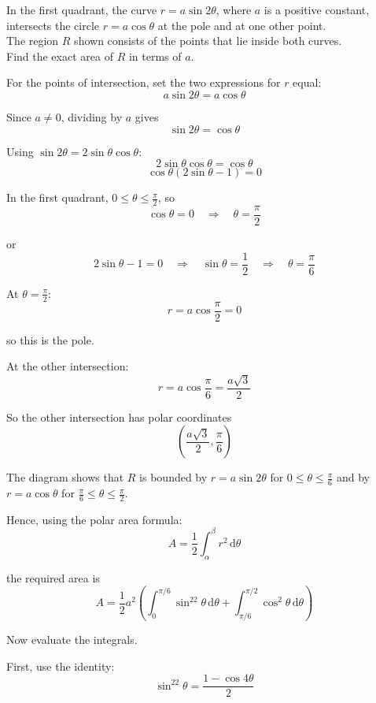 \documentclass[leqno]{article}
\begin{document}
\begin{enumerate}[
	  label=\textbf{\arabic*.},
	  leftmargin=*,
	  topsep=0pt,
	  partopsep=0pt,
	  parsep=0pt
	]
In the first quadrant, the curve $r=a\sin 2\theta$, where $a$ is a positive constant, intersects the circle $r=a\cos\theta$ at the pole and at one other point. \\

The region $R$ shown consists of the points that lie inside both curves. \\

Find the exact area of $R$ in terms of $a$.  \\

	\vspace*{10pt}
	
	\begin{djsSolution}
	For the points of intersection, set the two expressions for \(r\) equal:
	\[
	a\sin 2\theta=a\cos\theta
	\]
	
	Since \(a\neq 0\), dividing by \(a\) gives
	\[
	\sin 2\theta=\cos\theta
	\]
	
	Using \(\sin 2\theta=2\sin\theta\cos\theta\):
	\[
	2\sin\theta\cos\theta=\cos\theta
	\]
	\[
	\cos\theta(2\sin\theta-1)=0
	\]
	
	In the first quadrant, \(0\le \theta\le \frac{\pi}{2}\), so
	\[
	\cos\theta=0\quad\Longrightarrow\quad\theta=\frac{\pi}{2}
	\]

	or
	\[
	2\sin\theta-1=0\quad\Longrightarrow\quad\sin\theta=\frac12\quad\Longrightarrow\quad\theta=\frac{\pi}{6}
	\]
	
	At \(\theta=\frac{\pi}{2}\):
	\[
	r=a\cos\frac{\pi}{2}=0
	\]

	so this is the pole.
	
	At the other intersection:
	\[
	r=a\cos\frac{\pi}{6}=\frac{a\sqrt3}{2}
	\]
	
	So the other intersection has polar coordinates
	\[
	\left(\frac{a\sqrt3}{2},\frac{\pi}{6}\right)
	\]
	
	The diagram shows that \(R\) is bounded by \(r=a\sin2\theta\) for \(0\le \theta\le \frac{\pi}{6}\) and by \(r=a\cos\theta\) for \(\frac{\pi}{6}\le \theta\le \frac{\pi}{2}\).
	
	Hence, using the polar area formula:
	\[
	A=\frac12\int_{\alpha}^{\beta} r^2\,\mathrm{d}\theta
	\]

	the required area is
	\[
	A=\frac12a^2\left(\int_0^{\pi/6}\sin^22\theta\,\mathrm{d}\theta+\int_{\pi/6}^{\pi/2}\cos^2\theta\,\mathrm{d}\theta\right)
	\]
	
	Now evaluate the integrals.
	
	First, use the identity:
	\[
	\sin^22\theta=\frac{1-\cos4\theta}{2}
	\]


\end{djsSolution}
\end{enumerate}
\end{document}
